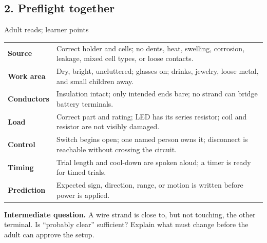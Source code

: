 {\subsection{2. Preflight together}
\begin{teloscard}{Adult reads; learner points}
\begin{tabularx}{\linewidth}{@{}p{.27\linewidth}L@{}}
\textbf{Source} & Correct holder and cells; no dents, heat, swelling, corrosion, leakage, mixed cell types, or loose contacts.\\
\textbf{Work area} & Dry, bright, uncluttered; glasses on; drinks, jewelry, loose metal, and small children away.\\
\textbf{Conductors} & Insulation intact; only intended ends bare; no strand can bridge battery terminals.\\
\textbf{Load} & Correct part and rating; LED has its series resistor; coil and resistor are not visibly damaged.\\
\textbf{Control} & Switch begins open; one named person owns it; disconnect is reachable without crossing the circuit.\\
\textbf{Timing} & Trial length and cool-down are spoken aloud; a timer is ready for timed trials.\\
\textbf{Prediction} & Expected sign, direction, range, or motion is written before power is applied.
\end{tabularx}
\end{teloscard}
\textbf{Intermediate question.} A wire strand is close to, but not touching, the other terminal. Is ``probably clear'' sufficient? Explain what must change before the adult can approve the setup.

}
